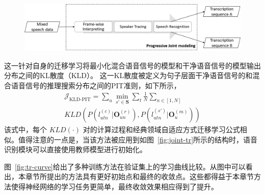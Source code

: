 \begin{figure}[!htp]
  \centering
    \captionstyle{\centering}
    \includegraphics[width=1.1\textwidth]{figure/sys-framework.png}
\end{figure}


这一针对自身的迁移学习将最小化混合语音信号的模型和干净语音信号的模型输出分布之间的KL散度（KLD）。
这一KL散度被定义为句子层面干净语音信号的和混合语音信号的推理搜索分布之间的PIT准则，如下所示，
\begin{equation}
\label{equ:kld-opt}
\begin{split}
\mathcal{J}_{\text{KLD-PIT}}=\sum_u \min_{s'\in \mathbf{S}} \sum_t \frac{1}{N} \sum_{n\in[1,N]} \\
KLD(P({l}_{utn}^{(c)}|\mathbf{O}_{un}^{(r)}),P({l}_{utn}^{(s')}|\mathbf{O}_{u}^{(m)}))
\end{split}
\end{equation}
该式中，每个 $KLD(\cdot)$ 对的计算过程和经典领域自适应方式迁移学习公式相似。值得注意的一点是，当该方法被应用到如图~\ref{fig:joint-tr}所示的结构时，语音识别模块可以直接使用教师模型进行初始化。

图~\ref{fig:tr-curve}给出了多种训练方法在验证集上的学习曲线比较。从图中可以看出，本章节所提出的方法具有更好初始点和最终的收敛点。这些都得益于本章节方法使得神经网络的学习任务更简单，最终收敛效果相应得到了提升。


